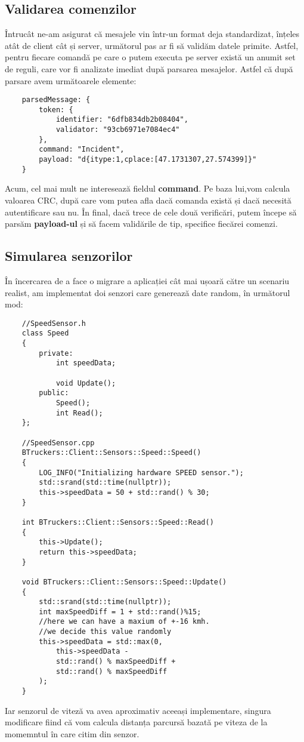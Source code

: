 \documentclass{article}
\begin{document}
\subsection{Validarea comenzilor}
Întrucât ne-am asigurat că mesajele vin într-un format deja standardizat, înțeles atât de client cât și server, următorul pas ar fi să validăm datele primite. Astfel, pentru fiecare comandă pe care o putem executa pe server există un anumit set de reguli, care vor fi analizate imediat după parsarea mesajelor. Astfel că după parsare avem următoarele elemente:
\begin{lstlisting}
    parsedMessage: {
        token: {
            identifier: "6dfb834db2b08404",
            validator: "93cb6971e7084ec4"
        },
        command: "Incident",
        payload: "d{itype:1,cplace:[47.1731307,27.574399]}"
    }    
\end{lstlisting}
Acum, cel mai mult ne interesează fieldul \textbf{command}. Pe baza lui,vom calcula valoarea CRC, după care vom  putea afla dacă comanda există și dacă necesită autentificare sau nu. În final, dacă trece de cele două verificări, putem începe să parsăm \textbf{payload-ul} și să facem validările de tip, specifice fiecărei comenzi. 

\subsection{Simularea senzorilor}
În încercarea de a face o migrare a aplicației cât mai ușoară către un scenariu realist, am implementat doi senzori care generează date random, în următorul mod:
\vspace{0.5cm}
\begin{lstlisting}
    //SpeedSensor.h
    class Speed
    {
        private:
            int speedData;
            
            void Update();
        public:
            Speed();
            int Read();
    };

    //SpeedSensor.cpp
    BTruckers::Client::Sensors::Speed::Speed()
    {
        LOG_INFO("Initializing hardware SPEED sensor.");
        std::srand(std::time(nullptr));
        this->speedData = 50 + std::rand() % 30;
    }

    int BTruckers::Client::Sensors::Speed::Read()
    {
        this->Update();
        return this->speedData;
    }

    void BTruckers::Client::Sensors::Speed::Update()
    {
        std::srand(std::time(nullptr));
        int maxSpeedDiff = 1 + std::rand()%15;
        //here we can have a maxium of +-16 kmh. 
        //we decide this value randomly
        this->speedData = std::max(0,
            this->speedData - 
            std::rand() % maxSpeedDiff +
            std::rand() % maxSpeedDiff 
        );
    }
\end{lstlisting}
Iar senzorul de viteză va avea aproximativ aceeași implementare, singura modificare fiind că vom calcula distanța parcursă bazată pe viteza de la momemntul în care citim din senzor. 
\end{document}
